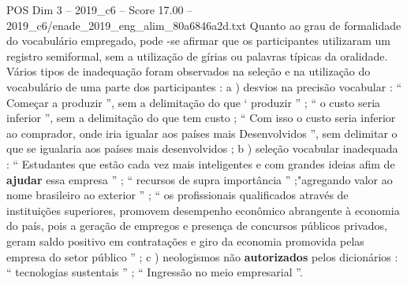 \begin{textsample}{POS Dim 3 – 2019\_c6 – Score 17.00 – 2019\_c6/enade\_2019\_eng\_alim\_80a6846a2d.txt}
Quanto ao grau de formalidade do vocabulário empregado, pode -se afirmar que os participantes utilizaram um registro semiformal, sem a utilização de gírias ou palavras típicas da oralidade.
Vários tipos de inadequação foram observados na seleção e na utilização do vocabulário de uma parte dos participantes : a ) desvios na precisão vocabular : “ Começar a produzir ”, sem a delimitação do que ‘ produzir ” ; “ o custo seria inferior ”, sem a delimitação do que tem custo ; “ Com isso o custo seria inferior ao comprador, onde iria igualar aos países mais Desenvolvidos ”, sem delimitar o que se igualaria aos países mais desenvolvidos ; b ) seleção vocabular inadequada : “ Estudantes que estão cada vez mais inteligentes e com grandes ideias afim de \textbf{ajudar} essa empresa ” ; “ recursos de supra importância ” ;"agregando valor ao nome brasileiro ao exterior ” ; “ os profissionais qualificados através de instituições superiores, promovem desempenho econômico abrangente à economia do país, pois a geração de empregos e presença de concursos públicos privados, geram saldo positivo em contratações e giro da economia promovida pelas empresa do setor público ” ; c ) neologismos não \textbf{autorizados} pelos dicionários : “ tecnologias sustentais ” ; “ Ingressão no meio empresarial ”.

\end{textsample}
